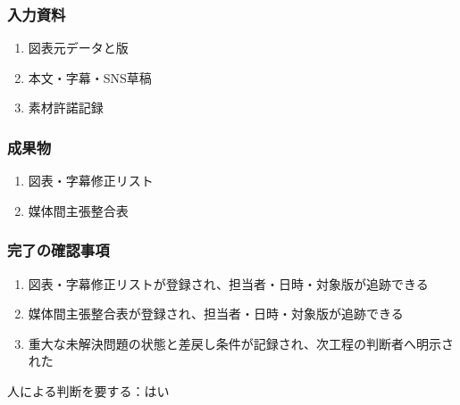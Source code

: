 \documentclass[a4paper,11pt]{article}
\begin{document}
\subsubsection*{入力資料}
\begin{enumerate}[leftmargin=2em,itemsep=0.35em]
\item 図表元データと版
\item 本文・字幕・SNS草稿
\item 素材許諾記録
\end{enumerate}
\subsubsection*{成果物}
\begin{enumerate}[leftmargin=2em,itemsep=0.35em]
\item 図表・字幕修正リスト
\item 媒体間主張整合表
\end{enumerate}
\subsubsection*{完了の確認事項}
\begin{enumerate}[leftmargin=2em,itemsep=0.35em]
\item 図表・字幕修正リストが登録され、担当者・日時・対象版が追跡できる
\item 媒体間主張整合表が登録され、担当者・日時・対象版が追跡できる
\item 重大な未解決問題の状態と差戻し条件が記録され、次工程の判断者へ明示された
\end{enumerate}
\par 人による判断を要する：はい\par\medskip
\end{document}
